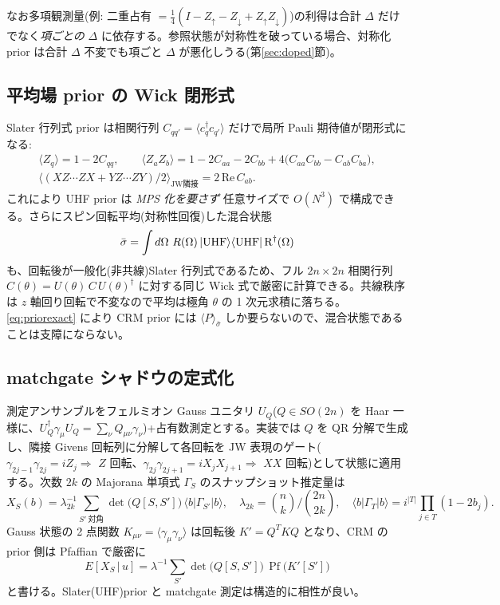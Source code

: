 \documentclass[11pt,a4paper]{ltjsarticle}
\newcommand{\bra}[1]{\langle #1|}
\newcommand{\ket}[1]{|#1\rangle}
\newcommand{\ev}[1]{\langle #1\rangle}
\newcommand{\Pf}{\operatorname{Pf}}
\newcommand{\gd}{\gamma}
\begin{document}
なお多項観測量(例: 二重占有 $=\tfrac14(I-Z_\uparrow-Z_\downarrow+Z_\uparrow Z_\downarrow)$)の利得は合計 $\Delta$ だけでなく\emph{項ごとの} $\Delta$ に依存する。参照状態が対称性を破っている場合、対称化 prior は合計 $\Delta$ 不変でも項ごと $\Delta$ が悪化しうる(第\ref{sec:doped}節)。

\subsection{平均場 prior の Wick 閉形式}
\label{sec:wick}
Slater 行列式 prior は相関行列 $C_{qq'}=\ev{c^\dagger_q c_{q'}}$ だけで局所 Pauli 期待値が閉形式になる:
\begin{gather}
  \ev{Z_q} = 1-2C_{qq},\qquad
  \ev{Z_a Z_b} = 1-2C_{aa}-2C_{bb}+4\bigl(C_{aa}C_{bb}-C_{ab}C_{ba}\bigr),\\
  \bigl\langle (XZ\cdots ZX + YZ\cdots ZY)/2\bigr\rangle_{\text{JW隣接}} = 2\,\mathrm{Re}\,C_{ab}.
\end{gather}
これにより UHF prior は \emph{MPS 化を要さず} 任意サイズで $O(N^3)$ で構成できる。さらにスピン回転平均(対称性回復)した混合状態
\begin{equation}
  \bar\sigma = \int d\Omega\ R(\Omega)\,\ket{\rm UHF}\bra{\rm UHF}\,R^\dagger(\Omega)
  \label{eq:symuhf}
\end{equation}
も、回転後が一般化(非共線)Slater 行列式であるため、フル $2n\times2n$ 相関行列 $C(\theta)=U(\theta)\,C\,U(\theta)^\dagger$ に対する同じ Wick 式で厳密に計算できる。共線秩序は $z$ 軸回り回転で不変なので平均は極角 $\theta$ の 1 次元求積に落ちる。\eqref{eq:priorexact} により CRM prior には $\ev{P}_{\bar\sigma}$ しか要らないので、混合状態であることは支障にならない。

\subsection{matchgate シャドウの定式化}
\label{sec:matchgate-method}
測定アンサンブルをフェルミオン Gauss ユニタリ $U_Q$($Q\in SO(2n)$ を Haar 一様に、$U_Q^\dagger \gd_\mu U_Q=\sum_\nu Q_{\mu\nu}\gd_\nu$)+占有数測定とする。実装では $Q$ を QR 分解で生成し、隣接 Givens 回転列に分解して各回転を JW 表現のゲート($\gd_{2j-1}\gd_{2j}=iZ_j\Rightarrow$ $Z$ 回転、$\gd_{2j}\gd_{2j+1}=iX_jX_{j+1}\Rightarrow$ $XX$ 回転)として状態に適用する。次数 $2k$ の Majorana 単項式 $\Gamma_S$ のスナップショット推定量は
\begin{equation}
  X_S(b) = \lambda_{2k}^{-1}\sum_{S'\ \text{対角}}\det\!\bigl(Q[S,S']\bigr)\,\bra{b}\Gamma_{S'}\ket{b},\quad
  \lambda_{2k}=\binom{n}{k}\Big/\binom{2n}{2k},\quad
  \bra{b}\Gamma_T\ket{b}=i^{|T|}\!\prod_{j\in T}\!(1-2b_j).
\end{equation}
Gauss 状態の 2 点関数 $K_{\mu\nu}=\ev{\gd_\mu\gd_\nu}$ は回転後 $K'=Q^T K Q$ となり、CRM の prior 側は Pfaffian で厳密に
\begin{equation}
  E[X_S\,|\,u] = \lambda^{-1}\sum_{S'}\det\!\bigl(Q[S,S']\bigr)\,\Pf\!\bigl(K'[S']\bigr)
\end{equation}
と書ける。Slater(UHF)prior と matchgate 測定は構造的に相性が良い。
\end{document}

